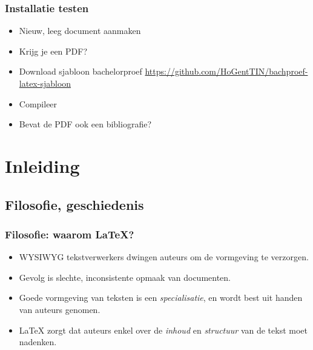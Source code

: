 \documentclass[aspectratio=169]{beamer}
\begin{document}
\begin{frame}
  \frametitle{Installatie testen}

  \begin{itemize}
    \item Nieuw, leeg document aanmaken
    \item Krijg je een PDF?
    \item Download sjabloon bachelorproef \url{https://github.com/HoGentTIN/bachproef-latex-sjabloon}
    \item Compileer
    \item Bevat de PDF ook een bibliografie?
  \end{itemize}
\end{frame}

\section{Inleiding}

\subsection{Filosofie, geschiedenis}

\begin{frame}
  \frametitle{Filosofie: waarom {\LaTeX}?}

  \begin{itemize}
    \item<+-> WYSIWYG tekstverwerkers dwingen auteurs om de vormgeving te verzorgen.
    \item<+-> Gevolg is slechte, inconsistente opmaak van documenten.
    \item<+-> Goede vormgeving van teksten is een \textit{specialisatie}, en wordt best
    uit handen van auteurs genomen.
    \item<+-> {\LaTeX} zorgt dat auteurs enkel over de \textit{inhoud} en \textit{structuur} van de tekst moet nadenken.
  \end{itemize}
\end{frame}
\end{document}
